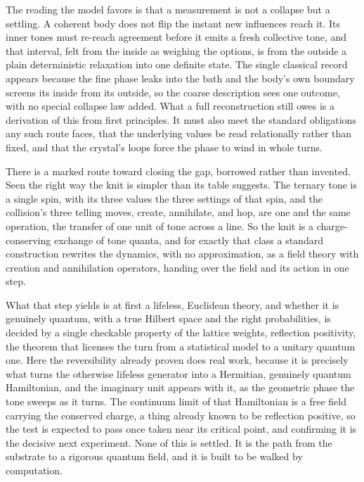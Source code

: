 The reading the model favors is that a measurement is not a collapse but a settling. A coherent body does not flip the instant new influences reach it. Its inner tones must re-reach agreement before it emits a fresh collective tone, and that interval, felt from the inside as weighing the options, is from the outside a plain deterministic relaxation into one definite state. The single classical record appears because the fine phase leaks into the bath and the body's own boundary screens its inside from its outside, so the coarse description sees one outcome, with no special collapse law added. What a full reconstruction still owes is a derivation of this from first principles. It must also meet the standard obligations any such route faces, that the underlying values be read relationally rather than fixed, and that the crystal's loops force the phase to wind in whole turns.

There is a marked route toward closing the gap, borrowed rather than invented. Seen the right way the knit is simpler than its table suggests. The ternary tone is a single spin, with its three values the three settings of that spin, and the collision's three telling moves, create, annihilate, and hop, are one and the same operation, the transfer of one unit of tone across a line. So the knit is a charge-conserving exchange of tone quanta, and for exactly that class a standard construction rewrites the dynamics, with no approximation, as a field theory with creation and annihilation operators, handing over the field and its action in one step.

What that step yields is at first a lifeless, Euclidean theory, and whether it is genuinely quantum, with a true Hilbert space and the right probabilities, is decided by a single checkable property of the lattice weights, reflection positivity, the theorem that licenses the turn from a statistical model to a unitary quantum one. Here the reversibility already proven does real work, because it is precisely what turns the otherwise lifeless generator into a Hermitian, genuinely quantum Hamiltonian, and the imaginary unit appears with it, as the geometric phase the tone sweeps as it turns. The continuum limit of that Hamiltonian is a free field carrying the conserved charge, a thing already known to be reflection positive, so the test is expected to pass once taken near its critical point, and confirming it is the decisive next experiment. None of this is settled. It is the path from the substrate to a rigorous quantum field, and it is built to be walked by computation.
